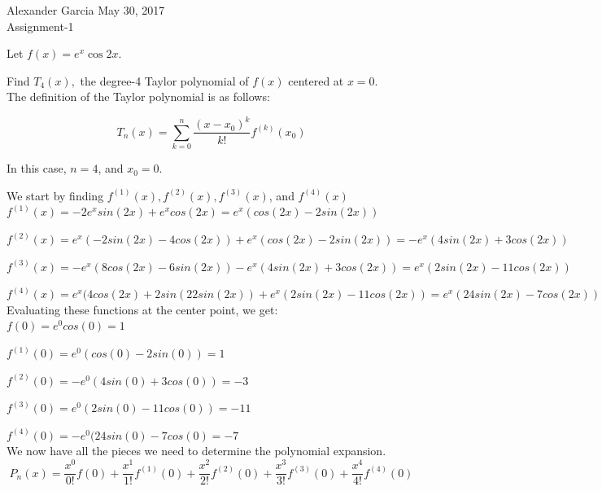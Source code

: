 % 




\bc Alexander Garcia \hfill May 30, 2017 \\ Assignment-1\ec

\bigskip

\benum

\item Let $f(x) = e^{x}\cos {2x}.$
\benum
\item Find $T_4(x),$ the degree-4 Taylor polynomial of $f(x)$ centered at $x=0.$ \\

	The definition of the Taylor polynomial is as follows:

	$$T_n(x) = \sum_{k=0}^{n}{\frac{(x-x_0)^k}{k!}f^{(k)}(x_0)}$$

	In this case, $n=4$, and $x_0 = 0$.

	We start by finding $f^{(1)}(x), f^{(2)}(x), f^{(3)}(x)$, and $f^{(4)}(x)$ \\

	$f^{(1)}(x) = -2e^xsin(2x)+e^xcos(2x) = e^x(cos(2x)-2sin(2x))$

	$f^{(2)}(x) = e^x(-2sin(2x)-4cos(2x))+e^x(cos(2x)-2sin(2x)) = -e^x(4sin(2x)+3cos(2x))$

	$f^{(3)}(x) = -e^x(8cos(2x)-6sin(2x)) - e^x(4sin(2x)+3cos(2x)) = e^x(2sin(2x)-11cos(2x))$

	$f^{(4)}(x) = e^x(4cos(2x)+2sin(22sin(2x)) + e^x(2sin(2x)-11cos(2x)) = e^x(24sin(2x)-7cos(2x))$ \\

	Evaluating these functions at the center point, we get: \\

	$f(0) = e^0cos(0) = 1$

	$f^{(1)}(0) = e^0(cos(0)-2sin(0)) = 1$

	$f^{(2)}(0) = -e^0(4sin(0)+3cos(0)) = -3$

	$f^{(3)}(0) = e^0(2sin(0)-11cos(0)) = -11$

	$f^{(4)}(0) = -e^0(24sin(0)-7cos(0) = -7$ \\

	We now have all the pieces we need to determine the polynomial expansion. \\

	$$P_n(x) = \frac{x^0}{0!} f(0) + \frac{x^1}{1!} f^{(1)}(0) + \frac{x^2}{2!} f^{(2)}(0) +
	\frac{x^3}{3!} f^{(3)}(0) + \frac{x^4}{4!} f^{(4)}(0)$$

